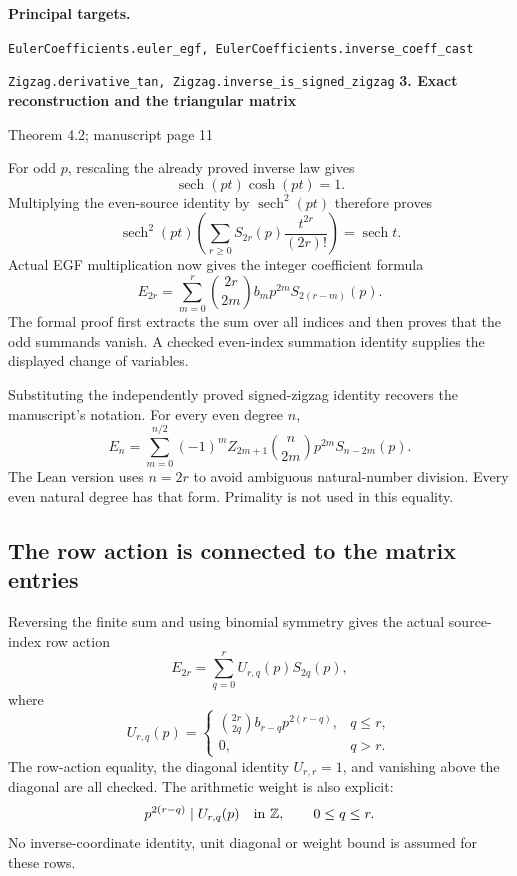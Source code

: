 \documentclass[11pt]{article}
\newcommand{\target}[1]{{\footnotesize\texttt{#1}}}
\newcommand{\pageheading}[2]{{\Large\bfseries\color{ink}#1}\par{\small #2}\par\medskip}
\newcommand{\sech}{\operatorname{sech}}
\begin{document}
\textbf{Principal targets.}\par
\target{EulerCoefficients.euler\_egf, EulerCoefficients.inverse\_coeff\_cast}\par
\target{Zigzag.derivative\_tan, Zigzag.inverse\_is\_signed\_zigzag}
\newpage
\pageheading{3. Exact reconstruction and the triangular matrix}{Theorem 4.2; manuscript page 11}
For odd $p$, rescaling the already proved inverse law gives
\[
 \sech(pt)\cosh(pt)=1.
\]
Multiplying the even-source identity by $\sech^2(pt)$ therefore proves
\[
 \sech^2(pt)\left(\sum_{r\ge0}S_{2r}(p)\frac{t^{2r}}{(2r)!}\right)=\sech t.
\]
Actual EGF multiplication now gives the integer coefficient formula
\[
 \boxed{E_{2r}=\sum_{m=0}^{r}\binom{2r}{2m}b_m p^{2m}S_{2(r-m)}(p).}
\]
The formal proof first extracts the sum over all indices and then proves that the odd summands vanish. A checked even-index summation identity supplies the displayed change of variables.

Substituting the independently proved signed-zigzag identity recovers the manuscript's notation. For every even degree $n$,
\[
 \boxed{E_n=\sum_{m=0}^{n/2}(-1)^m Z_{2m+1}\binom n{2m}p^{2m}S_{n-2m}(p).}
\]
The Lean version uses $n=2r$ to avoid ambiguous natural-number division. Every even natural degree has that form. Primality is not used in this equality.

\subsection*{The row action is connected to the matrix entries}
Reversing the finite sum and using binomial symmetry gives the actual source-index row action
\[
 E_{2r}=\sum_{q=0}^{r}U_{r,q}(p)S_{2q}(p),
\]
where
\[
 U_{r,q}(p)=
 \begin{cases}
 \displaystyle\binom{2r}{2q}b_{r-q}p^{2(r-q)},&q\le r,\\
 0,&q>r.
 \end{cases}
\]
The row-action equality, the diagonal identity $U_{r,r}=1$, and vanishing above the diagonal are all checked. The arithmetic weight is also explicit:
\[
 p^{2(r-q)}\mid U_{r,q}(p)\quad\text{in }\mathbb Z,\qquad 0\le q\le r.
\]
No inverse-coordinate identity, unit diagonal or weight bound is assumed for these rows.
\end{document}
